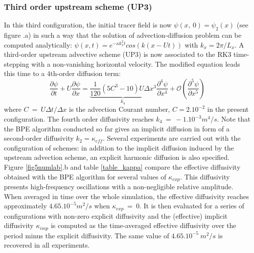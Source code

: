 \subsubsection{Third order upstream scheme (UP3)}
In this third configuration, the initial tracer field is now $\psi(x,\ 0)=\psi_2(x)$ (see figure .a) in such a way that the solution of advection-diffusion problem can be computed analytically: $\psi(x,t)=e^{-\kappa k_x^2 t}cos(k(x-Ut))$ with $k_x=2\pi/L_x$.
A third-order upstream advective scheme (UP3) is now associated to the RK3 time-stepping with a non-vanishing horizontal velocity. The modified equation leads this time to a 4th-order diffusion term:
\begin{equation}
\frac{\partial \psi}{\partial t}+U \frac{\partial \psi}{\partial x} = \underbrace{\frac{1}{120}(5 C^3-10) U \Delta x^3}_{k_4}  \frac{\partial^4 \psi}{\partial x^4} + \mathcal{O}(\frac{\partial^5 \psi}{\partial x^5})
\end{equation}
where $C\ =\ U\Delta t/\Delta x$ is the advection Courant number, $C=2 . 10^{-2}$ in the present configuration. The fourth order diffusivity reaches $k_4\ =\ -1.10^{-3} m^4/s$. Note that the BPE algorithm conducted so far gives an implicit diffusion in form of a second-order diffusivity $k_2=\kappa_{eff}$.
Several experiments are carried out with the configuration of schemes: in addition to the implicit diffusion induced by the upstream advection scheme, an explicit harmonic diffusion is also specified. \\
Figure \ref{fig5numlab}.b and table \ref{table_kappa} compare the effective diffusivity obtained with the BPE algorithm for several values of $\kappa_{exp}$. This diffusivity presents high-frequency oscillations with a non-negligible relative amplitude.\\
When averaged in time over the whole simulation, the effective diffusivity reaches approximately $4.65.10^{-5} m^2/s$ when $\kappa_{exp}\ =\ 0$. It is then evaluated for a series of configurations with non-zero explicit diffusivity and the (effective) implicit diffusivity $\kappa_{imp}$ is computed as the time-averaged effective diffusivity over the period minus the explicit diffusivity. The same  value of $4.65.10^{-5}\ m^2/s$ is recovered in all experiments.\\
